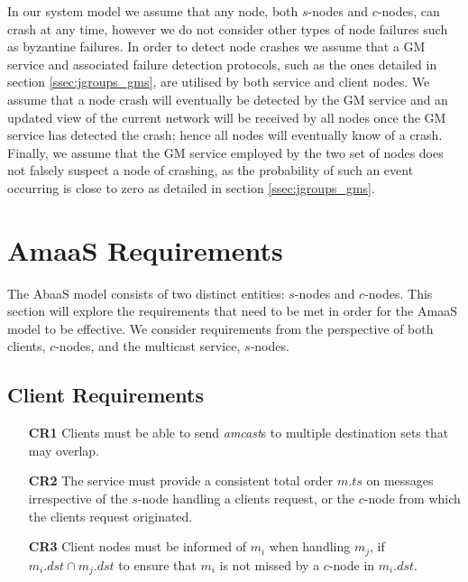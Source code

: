     In our system model we assume that any node, both $s$-nodes and $c$-nodes, can crash at any time, however we do not consider other types of node failures such as byzantine failures.  In order to detect node crashes we assume that a GM service and associated failure detection protocols, such as the ones detailed in section \ref{ssec:jgroups_gms}, are utilised by both service and client nodes.  We assume that a node crash will eventually be detected by the GM service and an updated view of the current network will be received by all nodes once the GM service has detected the crash; hence all nodes will eventually know of a crash.  Finally, we assume that the GM service employed by the two set of nodes does not falsely suspect a node of crashing, as the probability of such an event occurring is close to zero as detailed in section \ref{ssec:jgroups_gms}.  
    
	
\section{AmaaS Requirements}\label{sec:absaas_requirements}
The \textsf{AbaaS} model consists of two distinct entities: $s$-nodes and $c$-nodes.  This section will explore the requirements that need to be met in order for the \textsf{AmaaS} model to be effective.  We consider requirements from the perspective of both clients, $c$-nodes, and the multicast service, $s$-nodes.

	\subsection*{Client Requirements}
	\begin{itemize}
		\item [\textbf{CR1}] Clients must be able to send \emph{amcast}s to multiple destination sets that may overlap.
		
		\item [\textbf{CR2}] The service must provide a consistent total order $m.ts$ on messages irrespective of the $s$-node handling a clients request, or the $c$-node from which the clients request originated.  
		
		\item [\textbf{CR3}] Client nodes must be informed of $m_i$ when handling $m_j$, if $m_i.dst \cap m_j.dst$ to ensure that $m_i$ is not missed by a $c$-node in $m_i.dst$.  
	\end{itemize}
	
